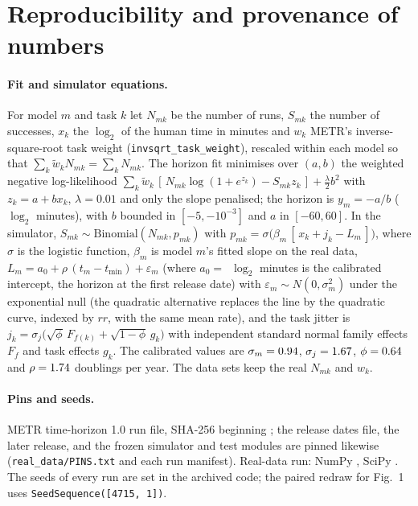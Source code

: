 \documentclass[aps,pre,twocolumn,superscriptaddress,nofootinbib,9pt]{revtex4-2}
\newcommand{\rr}{rr}
\begin{document}
\section{Reproducibility and provenance of numbers}\label{sup:repro}
\paragraph*{Fit and simulator equations.} For model $m$ and task $k$ let $N_{mk}$ be the number of runs, $S_{mk}$ the number of successes, $x_k$ the $\log_2$ of the human time in minutes and $w_k$ METR's inverse-square-root task weight (\texttt{invsqrt\_task\_weight}), rescaled within each model so that $\sum_k \tilde w_k N_{mk}=\sum_k N_{mk}$. The horizon fit minimises over $(a,b)$ the weighted negative log-likelihood $\sum_k \tilde w_k\,[\,N_{mk}\log(1+e^{z_k})-S_{mk}z_k\,]+\tfrac{\lambda}{2}b^2$ with $z_k=a+bx_k$, $\lambda=0.01$ and only the slope penalised; the horizon is $y_m=-a/b$ ($\log_2$ minutes), with $b$ bounded in $[-5,-10^{-3}]$ and $a$ in $[-60,60]$. In the simulator, $S_{mk}\sim\mathrm{Binomial}(N_{mk},p_{mk})$ with $p_{mk}=\sigma\big(\beta_m\,[\,x_k+j_k-L_m\,]\big)$, where $\sigma$ is the logistic function, $\beta_m$ is model $m$'s fitted slope on the real data, $L_m=a_0+\rho\,(t_m-t_{\min})+\varepsilon_m$ (where $a_0={}$\simAZero\ $\log_2$ minutes is the calibrated intercept, the horizon at the first release date) with $\varepsilon_m\sim N(0,\sigma_m^2)$ under the exponential null (the quadratic alternative replaces the line by the quadratic curve, indexed by $\rr$, with the same mean rate), and the task jitter is $j_k=\sigma_j\big(\sqrt{\phi}\,F_{f(k)}+\sqrt{1-\phi}\,g_k\big)$ with independent standard normal family effects $F_f$ and task effects $g_k$. The calibrated values are $\sigma_m=0.94$, $\sigma_j=1.67$, $\phi=0.64$ and $\rho=1.74$ doublings per year. The data sets keep the real $N_{mk}$ and $w_k$.

\paragraph*{Pins and seeds.} METR time-horizon 1.0 run file, SHA-256 beginning \runsSha; the release dates file, the later release, and the frozen simulator and test modules are pinned likewise (\texttt{real\_data/PINS.txt} and each run manifest). Real-data run: NumPy \numpyV, SciPy \scipyV. The seeds of every run are set in the archived code; the paired redraw for Fig.~1 uses \texttt{SeedSequence([4715, 1])}.
\end{document}
